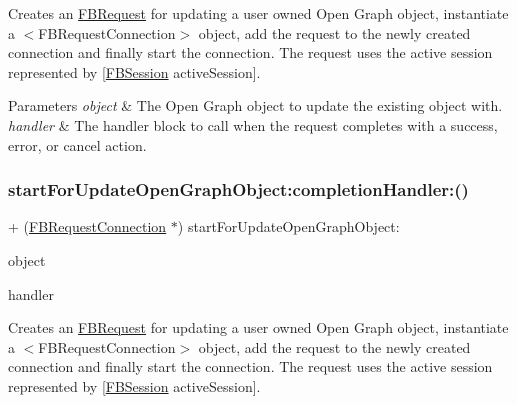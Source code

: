 Creates an {\ttfamily \hyperlink{interfaceFBRequest}{F\+B\+Request}} for updating a user owned Open Graph object, instantiate a $<$\+F\+B\+Request\+Connection$>$ object, add the request to the newly created connection and finally start the connection. The request uses the active session represented by {\ttfamily \mbox{[}\hyperlink{interfaceFBSession}{F\+B\+Session} active\+Session\mbox{]}}.


\begin{DoxyParams}{Parameters}
{\em object} & The Open Graph object to update the existing object with.\\
\hline
{\em handler} & The handler block to call when the request completes with a success, error, or cancel action. \\
\hline
\end{DoxyParams}
\mbox{\label{interfaceFBRequestConnection_a481c4621f12410a7f6bbc7a0ccd6890b}} 
\subsubsection{\texorpdfstring{start\+For\+Update\+Open\+Graph\+Object\+:completion\+Handler\+:()}{startForUpdateOpenGraphObject:completionHandler:()}\hspace{0.1cm}{\footnotesize\ttfamily [3/5]}}
{\footnotesize\ttfamily + (\hyperlink{interfaceFBRequestConnection}{F\+B\+Request\+Connection} $\ast$) start\+For\+Update\+Open\+Graph\+Object\+: \begin{DoxyParamCaption}\item[{(id$<$ \hyperlink{protocolFBOpenGraphObject-p}{F\+B\+Open\+Graph\+Object} $>$)}]{object }\item[{completionHandler:(F\+B\+Request\+Handler)}]{handler }\end{DoxyParamCaption}}

Creates an {\ttfamily \hyperlink{interfaceFBRequest}{F\+B\+Request}} for updating a user owned Open Graph object, instantiate a $<$\+F\+B\+Request\+Connection$>$ object, add the request to the newly created connection and finally start the connection. The request uses the active session represented by {\ttfamily \mbox{[}\hyperlink{interfaceFBSession}{F\+B\+Session} active\+Session\mbox{]}}.


